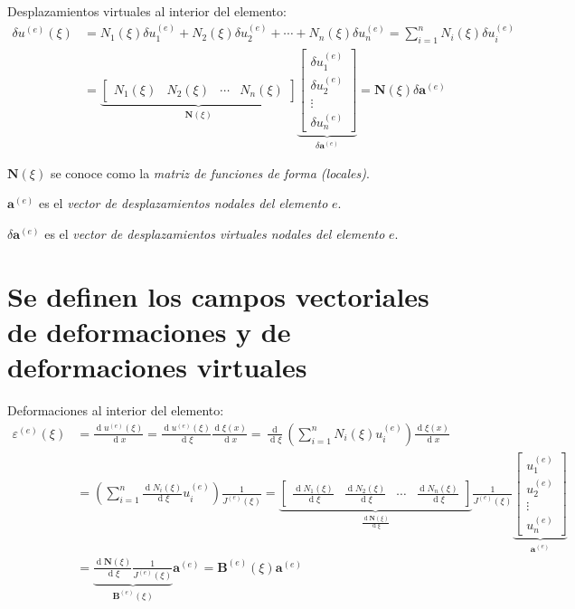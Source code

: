 \documentclass[12pt,letterpaper]{article}
\newcommand{\ve}[1]{{\boldsymbol{#1}}}
\newcommand{\ma}[1]{{\boldsymbol{#1}}}
\newcommand{\dd}{\operatorname{d} \!}
\begin{document}
Desplazamientos virtuales al interior del elemento:
\begin{align}
\delta u^{(e)}(\xi) 
&= N_1(\xi) \delta u_1^{(e)} + N_2(\xi) \delta u_2^{(e)} + \cdots + N_n(\xi) \delta u_n^{(e)} = \sum_{i=1}^n N_i(\xi) \delta u_i^{(e)} \\
&= 
\underbrace{\begin{bmatrix}
   N_1(\xi) & N_2(\xi) & \cdots & N_n(\xi)
   \end{bmatrix}}_{\ma{N}(\xi)}
\underbrace{\begin{bmatrix}
   \delta u_1^{(e)} \\ \delta u_2^{(e)} \\ \vdots \\ \delta u_n^{(e)} 
   \end{bmatrix}}_{\delta \ma{a}^{(e)}} = \ma{N}(\xi) \delta \ve{a}^{(e)}
\end{align}

$\ma{N}(\xi)$ se conoce como la \emph{matriz de funciones de forma (locales)}.

$\ve{a}^{(e)}$ es el \emph{vector de desplazamientos nodales del elemento} $e$.

$\delta\ve{a}^{(e)}$ es el \emph{vector de desplazamientos virtuales nodales del elemento} $e$.

\newpage

\section{Se definen los campos vectoriales de deformaciones y  de deformaciones virtuales}

Deformaciones al interior del elemento:
\begin{align}
\varepsilon^{(e)}(\xi) &= \frac{\dd u^{(e)}(\xi)}{\dd x} =
 \frac{\dd u^{(e)}(\xi)}{\dd \xi}\frac{\dd \xi(x)}{\dd x} = \frac{\dd}{\dd \xi}\left(\sum_{i=1}^n N_i(\xi) u_i^{(e)}\right)\frac{\dd \xi(x)}{\dd x} \\
 &= \left(\sum_{i=1}^n \frac{\dd N_i(\xi)}{\dd \xi} u_i^{(e)}\right) \frac{1}{J^{(e)}(\xi)} = 
\underbrace{\begin{bmatrix}
  \frac{\dd N_1(\xi)}{\dd \xi} & \frac{\dd N_2(\xi)}{\dd \xi} & \cdots & \frac{\dd N_n(\xi)}{\dd \xi}
   \end{bmatrix}}_{\frac{\dd \ma{N}(\xi)}{\dd \xi}} \frac{1}{J^{(e)}(\xi)}
\underbrace{\begin{bmatrix}
   u_1^{(e)} \\ u_2^{(e)} \\ \vdots \\ u_n^{(e)}
   \end{bmatrix}}_{\ma{a}^{(e)}} \\
&= 
\underbrace{\frac{\dd \ma{N}(\xi)}{\dd \xi}%
    \frac{1}{J^{(e)}(\xi)}}_{\ma{B}^{(e)}(\xi)}
\ma{a}^{(e)} = \ma{B}^{(e)}(\xi)  \ve{a}^{(e)}
\end{align}
\end{document}
